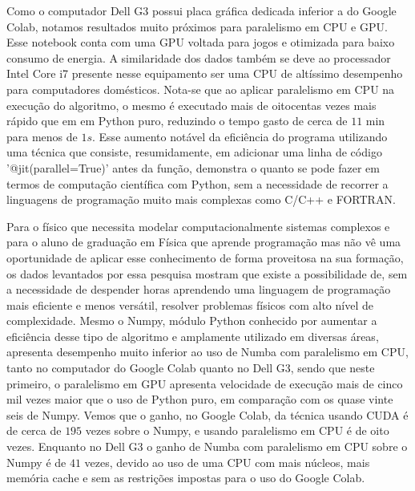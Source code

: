 \documentclass[
	12pt,				%
	a4paper,			%
	english,			%
	openright,				%
	brazil,				%
	oneside]{abntex2}
\begin{document}
	Como o computador Dell G3 possui placa gráfica dedicada inferior a do Google Colab, notamos resultados muito próximos para paralelismo em CPU e GPU. Esse notebook conta com uma GPU voltada para jogos e otimizada para baixo consumo de energia. A similaridade dos dados também se deve ao processador Intel Core i7 presente nesse equipamento ser uma CPU de altíssimo desempenho para computadores domésticos. Nota-se que ao aplicar paralelismo em CPU na execução do algoritmo, o mesmo é executado mais de oitocentas vezes mais rápido que em em Python puro, reduzindo o tempo gasto de cerca de $11$ min para menos de $1 s$. Esse aumento notável da eficiência do programa utilizando uma técnica que consiste, resumidamente, em adicionar uma linha de código '@jit(parallel=True)' antes da função, demonstra o quanto se pode fazer em termos de computação científica com Python, sem a necessidade de recorrer a linguagens de programação muito mais complexas como C/C++ e FORTRAN.
	
	Para o físico que necessita modelar computacionalmente sistemas complexos e para o aluno de graduação em Física que aprende programação mas não vê uma oportunidade de aplicar esse conhecimento de forma proveitosa na sua formação, os dados levantados por essa pesquisa mostram que existe a possibilidade de, sem a necessidade de despender horas aprendendo uma linguagem de programação mais eficiente e menos versátil, resolver problemas físicos com alto nível de complexidade. Mesmo o Numpy, módulo Python conhecido por aumentar a eficiência desse tipo de algoritmo e amplamente utilizado em diversas áreas, apresenta desempenho muito inferior ao uso de Numba com paralelismo em CPU, tanto no computador do Google Colab quanto no Dell G3, sendo que neste primeiro, o paralelismo em GPU apresenta velocidade de execução mais de cinco mil vezes maior que o uso de Python puro, em comparação com os quase vinte seis de Numpy. Vemos que o ganho, no Google Colab, da técnica usando CUDA é de cerca de $195$ vezes sobre o Numpy, e usando paralelismo em CPU é de oito vezes. Enquanto no Dell G3 o ganho de Numba com paralelismo em CPU sobre o Numpy é de $41$ vezes, devido ao uso de uma CPU com mais núcleos, mais memória cache e sem as restrições impostas para o uso do Google Colab.
	
\end{document}

